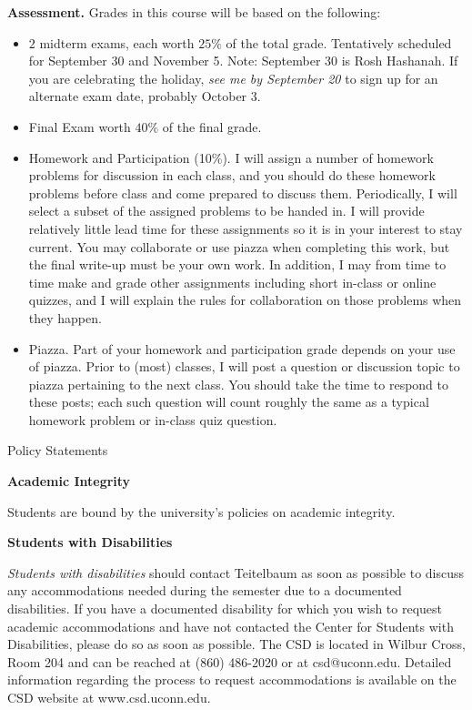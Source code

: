\documentclass[12pt]{article}
\begin{document}
{\bf Assessment.}  Grades in this course will be based on the
following:
\begin{itemize}
\item $2$ midterm exams, each worth $25\%$ of the total grade.
Tentatively scheduled for September 30 and November 5. Note: September
30 is Rosh Hashanah.  If you are celebrating the holiday, \textit{see
me by September 20} to sign up for an alternate exam date, probably
October 3.
\item Final Exam worth $40\%$ of the final grade.
\item Homework and Participation (10\%).  I will assign a number of
homework problems for discussion in each class, and you should do
these homework problems before class and come prepared to discuss
them.  Periodically, I will select a subset of the assigned problems
to be handed in.  I will provide relatively little lead time for these
assignments so it is in your interest to stay current. You may
collaborate or use piazza when completing this work, but the final
write-up must be your own work.  In addition, I may from time to time
make and grade other assignments including short in-class or online
quizzes, and I will explain the rules for collaboration on those
problems when they happen.
\item Piazza.  Part of your homework and participation grade depends
on your use of piazza.  Prior to (most) classes, I will post a
question or discussion topic to piazza pertaining to the next class.
You should take the time to respond to these posts; each such question
will count roughly the same as a typical homework problem or in-class
quiz question.
\end{itemize}

 

\begin{center}

{\Large Policy Statements}

\end{center}

{\bf Academic Integrity} 

Students are bound by the university's policies on academic integrity.

{\bf Students with Disabilities}

{\it Students with disabilities} should contact Teitelbaum as soon as
possible to discuss any accommodations needed during the semester due
to a documented disabilities.  If you have a documented disability for
which you wish to request academic accommodations and have not
contacted the Center for Students with Disabilities, please do so as
soon as possible.  The CSD is located in Wilbur Cross, Room 204 and
can be reached at (860) 486-2020 or at csd@uconn.edu.  Detailed
information regarding the process to request accommodations is
available on the CSD website at www.csd.uconn.edu.
\end{document}
